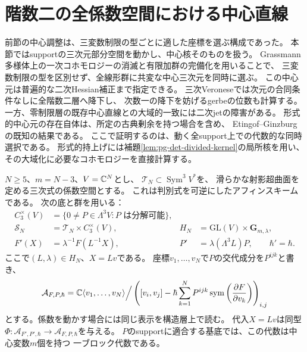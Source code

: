 \section{階数二の全係数空間における中心直線}
\label{sec:pg-intrinsic-rank-two-center}
前節の中心調整は、三変数制限の型ごとに適した座標を選ぶ構成であった。
本節ではsupportの三次元部分空間を動かし、中心核そのものを扱う。
Grassmann多様体上の一次コホモロジーの消滅と有限加群の完備化を用いることで、
三変数制限の型を区別せず、全線形群に共変な中心三次元を同時に選ぶ。
この中心元は普遍的な二次Hessian補正まで指定できる。
三次Veroneseでは次元の合同条件なしに全階数二層へ降下し、
次数一の降下を妨げるgerbeの位数も計算する。
一方、零制限層の既存中心直線との大域的一致には二次jetの障害がある。
形式的中心元の存在自体は、所定の古典剰余を持つ場合を含め、
Etingof--Ginzburg\cite[Proposition~8.1.1(i), pp.~1407--1408]{EG}の既知の結果である。
ここで証明するのは、動く全support上での代数的な同時選択である。
形式的持上げには補題\ref{lem:pg-det-divided-kernel}の局所核を用い、
その大域化に必要なコホモロジーを直接計算する。

$N\ge5$、$m=N-3$、$V=\mathbb C^N$とし、
$\mathcal T_N\subset\operatorname{Sym}^3V^*$を、
滑らかな射影超曲面を定める三次式の係数空間とする。
これは判別式を可逆にしたアフィンスキームである。
次の底と群を用いる：
\begin{equation}
 \begin{aligned}
 C_3^\times(V)&=
 \{0\ne P\in\Lambda^3V:P\text{ は分解可能}\},\\
 \mathcal S_N&=\mathcal T_N\times C_3^\times(V),
 &H_N&=\mathrm{GL}(V)\times\mathbf G_{m,\lambda},\\
 F'(X)&=\lambda^{-1}F(L^{-1}X),
 &P'&=\lambda(\Lambda^3L)P,\qquad \hbar'=\hbar.
 \end{aligned}
 \label{eq:pg-intrinsic-rank-two-parameters}
\end{equation}
ここで$(L,\lambda)\in H_N$、$X=Lv$である。
座標$v_1,\ldots,v_N$で$P$の交代成分を$P^{ijk}$と書き、
\begin{equation}
 \mathcal A_{F,P,\hbar}
 =\mathbb C\langle v_1,\ldots,v_N\rangle\Big/
 \left(
 [v_i,v_j]-\hbar\sum_{k=1}^N
 P^{ijk}\operatorname{sym}\left(\frac{\partial F}{\partial v_k}\right)
 \right)_{i,j}
 \label{eq:pg-intrinsic-rank-two-algebra}
\end{equation}
とする。係数を動かす場合には同じ表示を構造層上で読む。
代入$X=Lv$は同型
$\Phi:\mathcal A_{F',P',\hbar}\to\mathcal A_{F,P,\hbar}$を与える。
$P$のsupportに適合する基底では、この代数は中心変数$m$個を持つ
一ブロック代数である。

